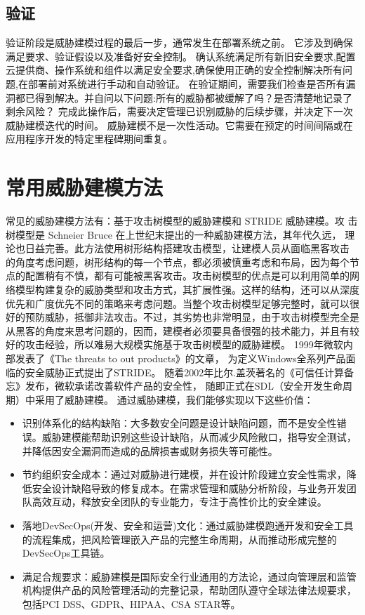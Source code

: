 \subsection[]{验证}

验证阶段是威胁建模过程的最后一步，通常发生在部署系统之前。 它涉及到确保满足要求、验证假设以及准备好安全控制。
确认系统满足所有新旧安全要求,配置云提供商、操作系统和组件以满足安全要求,确保使用正确的安全控制解决所有问题,在部署前对系统进行手动和自动验证。
在验证期间，需要我们检查是否所有漏洞都已得到解决。并自问以下问题:所有的威胁都被缓解了吗？是否清楚地记录了剩余风险？
完成此操作后，需要决定管理已识别威胁的后续步骤，并决定下一次威胁建模迭代的时间。
威胁建模不是一次性活动。它需要在预定的时间间隔或在应用程序开发的特定里程碑期间重复。

\section{常用威胁建模方法}

常见的威胁建模方法有：基于攻击树模型的威胁建模和 STRIDE 威胁建模。攻
击树模型是 Schneier Bruce 在上世纪末提出的一种威胁建模方法\cite{schneier1999attack}，其年代久远，
理论也日益完善。此方法使用树形结构搭建攻击模型，让建模人员从面临黑客攻击
的角度考虑问题，树形结构的每一个节点，都必须被慎重考虑和布局，因为每个节
点的配置稍有不慎，都有可能被黑客攻击。攻击树模型的优点是可以利用简单的网
络模型构建复杂的威胁类型和攻击方式，其扩展性强。这样的结构，还可以从深度
优先和广度优先不同的策略来考虑问题。当整个攻击树模型足够完整时，就可以很
好的预防威胁，抵御非法攻击。不过，其劣势也非常明显，由于攻击树模型完全是
从黑客的角度来思考问题的，因而，建模者必须要具备很强的技术能力，并且有较
好的攻击经验，所以难易大规模实施基于攻击树模型的威胁建模。
1999年微软内部发表了《The threats to out products》\cite{kohnfelder1999threats}的文章，
为定义Windows全系列产品面临的安全威胁正式提出了STRIDE。
随着2002年比尔.盖茨著名的《可信任计算备忘》发布，微软承诺改善软件产品的安全性，
随即正式在SDL（安全开发生命周期）中采用了威胁建模。
\newline
通过威胁建模，我们能够实现以下这些价值：
\begin{itemize}
    \item 识别体系化的结构缺陷：大多数安全问题是设计缺陷问题，而不是安全性错误。威胁建模能帮助识别这些设计缺陷，从而减少风险敞口，指导安全测试，并降低因安全漏洞而造成的品牌损害或财务损失等可能性。
    \item 节约组织安全成本：通过对威胁进行建模，并在设计阶段建立安全性需求，降低安全设计缺陷导致的修复成本。在需求管理和威胁分析阶段，与业务开发团队高效互动，释放安全团队的专业能力，专注于高性价比的安全建设。
    \item 落地DevSecOps(开发、安全和运营)文化：通过威胁建模跑通开发和安全工具的流程集成，把风险管理嵌入产品的完整生命周期，从而推动形成完整的DevSecOps工具链。
    \item 满足合规要求：威胁建模是国际安全行业通用的方法论，通过向管理层和监管机构提供产品的风险管理活动的完整记录，帮助团队遵守全球法律法规要求，包括PCI DSS、GDPR、HIPAA、CSA STAR等。
  \end{itemize}

